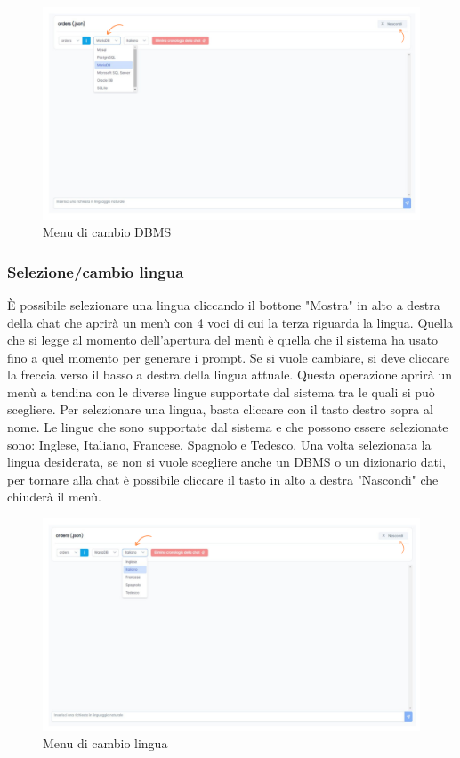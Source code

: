 \begin{figure}[H]
  \centering
  \includegraphics[width=1\textwidth]{assets/cambio_dbms.png}
  \caption{Menu di cambio DBMS}
\end{figure}

\subsubsection{Selezione/cambio lingua}

È possibile selezionare una lingua cliccando il bottone "Mostra" in alto a destra della chat che aprirà un menù con 4 voci di cui la terza riguarda la lingua. Quella che si legge al momento dell'apertura del menù è quella che il sistema ha usato fino a quel momento per generare i prompt. Se si vuole cambiare, si deve cliccare la freccia verso il basso a destra della lingua attuale. Questa operazione aprirà un menù a tendina con le diverse lingue supportate dal sistema tra le quali si può scegliere. Per selezionare una lingua, basta cliccare con il tasto destro sopra al nome. Le lingue che sono supportate dal sistema e che possono essere selezionate sono: Inglese, Italiano, Francese, Spagnolo e Tedesco. Una volta selezionata la lingua desiderata, se non si vuole scegliere anche un DBMS o un dizionario dati, per tornare alla chat è possibile cliccare il tasto in alto a destra "Nascondi" che chiuderà il menù.

\begin{figure}[H]
  \centering
  \includegraphics[width=1\textwidth]{assets/cambio_lingua.png}
  \caption{Menu di cambio lingua}
\end{figure}

